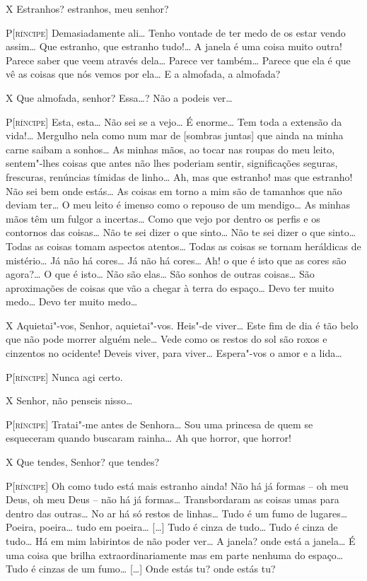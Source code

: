 \textsc{X} Estranhos? estranhos, meu senhor?

\textsc{P[ríncipe]} Demasiadamente ali\ldots{} Tenho vontade de ter medo de os
estar vendo assim\ldots{} Que estranho, que estranho tudo!\ldots{} A janela é
uma coisa muito outra! Parece saber que veem através dela\ldots{} Parece
ver também\ldots{} Parece que ela é que vê as coisas que nós vemos por
ela\ldots{} E a almofada, a almofada?

\textsc{X} Que almofada, senhor? Essa\ldots{}? Não a podeis ver\ldots{}

\textsc{P[ríncipe]} Esta, esta\ldots{} Não sei se a vejo\ldots{} É enorme\ldots{} Tem toda a
extensão da vida!\ldots{} Mergulho nela como num mar de [sombras juntas]
que ainda na minha carne saibam a sonhos\ldots{} As minhas mãos, ao tocar
nas roupas do meu leito, sentem"-lhes coisas que antes não lhes
poderiam sentir, significações seguras, frescuras, renúncias tímidas
de linho\ldots{} Ah, mas que estranho! mas que estranho! Não sei bem onde
estás\ldots{} As coisas em torno a mim são de tamanhos que não deviam
ter\ldots{} O meu leito é imenso como o repouso de um mendigo\ldots{} As minhas
mãos têm um fulgor a incertas\ldots{} Como que vejo por dentro os perfis e
os contornos das coisas\ldots{} Não te sei dizer o que sinto\ldots{} Não te sei
dizer o que sinto\ldots{} Todas as coisas tomam aspectos atentos\ldots{} Todas
as coisas se tornam heráldicas de mistério\ldots{} Já não há cores\ldots{} Já
não há cores\ldots{} Ah! o que é isto que as cores são agora?\ldots{} O que é
isto\ldots{} Não são elas\ldots{} São sonhos de outras coisas\ldots{} São
aproximações de coisas que vão a chegar à terra do espaço\ldots{} Devo ter
muito medo\ldots{} Devo ter muito medo\ldots{}

\textsc{X} Aquietai"-vos, Senhor, aquietai"-vos. Heis"-de viver\ldots{} Este fim de
dia é tão belo que não pode morrer alguém nele\ldots{} Vede como os restos
do sol são roxos e cinzentos no ocidente! Deveis viver, para viver\ldots{}
Espera"-vos o amor e a lida\ldots{}

\textsc{P[ríncipe]} Nunca agi certo.

\textsc{X} Senhor, não penseis nisso\ldots{}

\textsc{P[ríncipe]} Tratai"-me antes de Senhora\ldots{} Sou uma princesa de quem se
esqueceram quando buscaram rainha\ldots{} Ah que horror, que horror! 

\textsc{X} Que tendes, Senhor? que tendes?

\textsc{P[ríncipe]} Oh como tudo está mais estranho ainda! Não há já formas
-- oh meu Deus, oh meu Deus -- não há já formas\ldots{} Transbordaram as
coisas umas para dentro das outras\ldots{} No ar há só restos de linhas\ldots{}
Tudo é um fumo de lugares\ldots{} Poeira, poeira\ldots{} tudo em poeira\ldots{}
[\ldots{}] Tudo é cinza de tudo\ldots{} Tudo é cinza de tudo\ldots{} Há em mim
labirintos de não poder ver\ldots{} A janela? onde está a janela\ldots{} É uma
coisa que brilha extraordinariamente mas em parte nenhuma do
espaço\ldots{} Tudo é cinzas de um fumo\ldots{} [\ldots{}] Onde estás tu? onde estás
tu?

